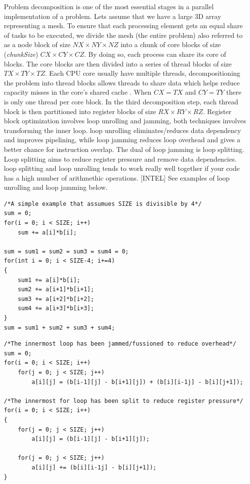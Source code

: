 Problem decomposition is one of the most essential stages in a parallel implementation of a problem. Lets assume that we have a large 3D array representing a mesh. To ensure that each processing element gets an equal share of tasks to be executed, we divide the mesh (the entire problem) also referred to as a node block of size \(NX \times NY \times NZ\) into a chunk of core blocks of size (\textit{chunkSize}) \(CX \times CY \times CZ\). By doing so, each process can share its core of blocks. The core blocks are then divided into a series of thread blocks of size \(TX \times TY \times TZ\). Each CPU core usually have multiple threads, decompositioning the problem into thread blocks allows threads to share data which helps reduce capacity misses in the core’s shared cache \cite{article9}. When \( CX = TX\) and \( CY = TY\) there is only one thread per core block. In the third decomposition step, each thread block is then partitioned into register blocks of size \(RX \times RY \times RZ\). Register block optimization involves loop unrolling and jamming, both techniques involves transforming the inner loop. loop unrolling eliminates/reduces data dependency and improves pipelining, while loop jamming reduces loop overhead and gives a better chance for instruction overlap\cite{article10}. The dual of loop jamming is loop splitting. Loop splitting aims to reduce register pressure and remove data dependencies. loop splitting and loop unrolling tends to work really well together if your code has a high number of arithmethic operations. [INTEL]  See examples of loop unrolling and loop jamming below. 

\begin{lstlisting}[caption=Loop unrolling]
/*A simple example that assumues SIZE is divisible by 4*/
sum = 0;
for(i = 0; i < SIZE; i++)
	sum += a[i]*b[i];

sum = sum1 = sum2 = sum3 = sum4 = 0;
for(int i = 0; i < SIZE-4; i+=4)
{
	sum1 += a[i]*b[i];
	sum2 += a[i+1]*b[i+1];
	sum3 += a[i+2]*b[i+2];
	sum4 += a[i+3]*b[i+3];
}
sum = sum1 + sum2 + sum3 + sum4;
\end{lstlisting}

\begin{lstlisting}[caption=Loop jamming and loop splitting]
/*The innermost loop has been jammed/fussioned to reduce overhead*/
sum = 0;
for(i = 0; i < SIZE; i++)
	for(j = 0; j < SIZE; j++)
		a[i][j] = (b[i-1][j] - b[i+1][j]) + (b[i][i-1j] - b[i][j+1]);

/*The innermost for loop has been split to reduce register pressure*/
for(i = 0; i < SIZE; i++)
{
	for(j = 0; j < SIZE; j++)
		a[i][j] = (b[i-1][j] - b[i+1][j]);
	
	for(j = 0; j < SIZE; j++)
		a[i][j] += (b[i][i-1j] - b[i][j+1]);
}
\end{lstlisting}

